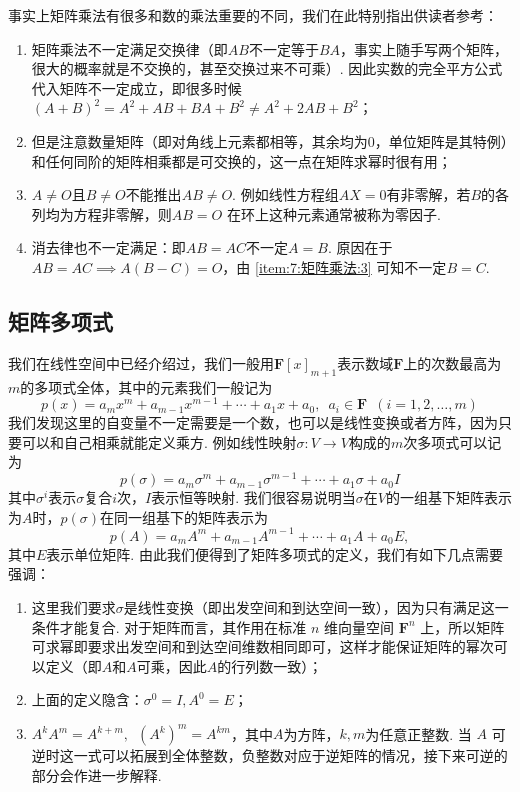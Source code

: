 事实上矩阵乘法有很多和数的乘法重要的不同，我们在此特别指出供读者参考：
\begin{enumerate}[label=(\arabic*)]
    \item 矩阵乘法不一定满足交换律（即$AB$不一定等于$BA$，事实上随手写两个矩阵，很大的概率就是不交换的，甚至交换过来不可乘）. 因此实数的完全平方公式代入矩阵不一定成立，即很多时候$(A+B)^2=A^2+AB+BA+B^2\neq A^2+2AB+B^2$；

    \item 但是注意数量矩阵（即对角线上元素都相等，其余均为0，单位矩阵是其特例）和任何同阶的矩阵相乘都是可交换的，这一点在矩阵求幂时很有用；

    \item \label{item:7:矩阵乘法:3}
          $A\neq O$且$B\neq O$不能推出$AB\neq O$. 例如线性方程组$AX = 0$有非零解，若$B$的各列均为方程非零解，则$AB = O$ 在环上这种元素通常被称为零因子.

    \item 消去律也不一定满足：即$AB = AC$不一定$A = B$. 原因在于$AB=AC \implies A(B-C)=O$，由 \ref*{item:7:矩阵乘法:3} 可知不一定$B = C$.
\end{enumerate}

\subsection{矩阵多项式}

我们在线性空间中已经介绍过，我们一般用$\mathbf{F}[x]_{m+1}$表示数域$\mathbf{F}$上的次数最高为$m$的多项式全体，其中的元素我们一般记为
\[p(x)=a_mx^m+a_{m-1}x^{m-1}+\cdots+a_1x+a_0,\enspace a_i\in\mathbf{F}\enspace(i=1,2,\ldots,m)\]
我们发现这里的自变量不一定需要是一个数，也可以是线性变换或者方阵，因为只要可以和自己相乘就能定义乘方. 例如线性映射$\sigma:V\to V$构成的$m$次多项式可以记为
\[p(\sigma)=a_m\sigma^m+a_{m-1}\sigma^{m-1}+\cdots+a_1\sigma+a_0I\]
其中$\sigma^i$表示$\sigma$复合$i$次，$I$表示恒等映射. 我们很容易说明当$\sigma$在$V$的一组基下矩阵表示为$A$时，$p(\sigma)$在同一组基下的矩阵表示为
\[p(A)=a_mA^m+a_{m-1}A^{m-1}+\cdots+a_1A+a_0E,\]
其中$E$表示单位矩阵. 由此我们便得到了矩阵多项式的定义，我们有如下几点需要强调：
\begin{enumerate}
    \item 这里我们要求$\sigma$是线性变换（即出发空间和到达空间一致），因为只有满足这一条件才能复合. 对于矩阵而言，其作用在标准 $n$ 维向量空间 $\mathbf{F}^n$ 上，所以矩阵可求幂即要求出发空间和到达空间维数相同即可，这样才能保证矩阵的幂次可以定义（即$A$和$A$可乘，因此$A$的行列数一致）；

    \item 上面的定义隐含：$\sigma^0 = I, A^0=E$；

    \item $A^kA^m=A^{k+m},\enspace (A^k)^m=A^{km}$，其中$A$为方阵，$k,m$为任意正整数. 当 $A$ 可逆时这一式可以拓展到全体整数，负整数对应于逆矩阵的情况，接下来可逆的部分会作进一步解释.
\end{enumerate}

